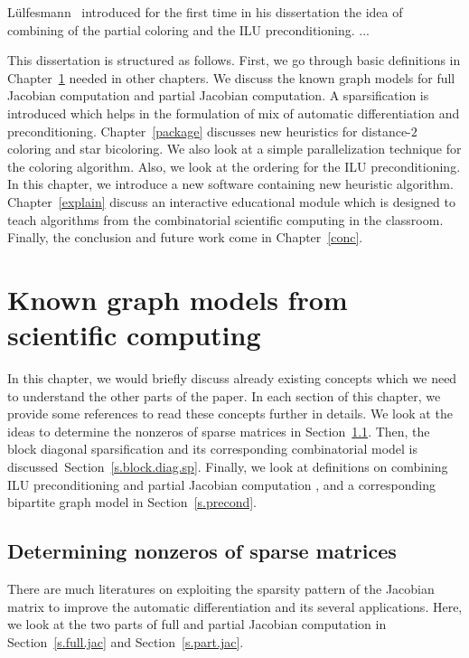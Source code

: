 \documentclass[12pt, twoside,a4paper,toc=bibliography]{scrbook}
\newcommand{\secref}[1]{Section~\protect\ref{#1}}
\newcommand{\chapref}[1]{Chapter~\protect\ref{#1}}
\begin{document}
Lülfesmann~\cite{Lulfesmann2012Fap} introduced for the first time in his dissertation
the idea of combining of the partial coloring and the ILU preconditioning. 
...

This dissertation is structured as follows.
First, we go through basic definitions in \chapref{prel} needed in other chapters.
We discuss the known graph models for full Jacobian computation and partial Jacobian
computation. A sparsification is introduced which helps in the formulation of
mix of automatic differentiation and preconditioning.
\chapref{package} discusses new heuristics for distance-$2$ coloring and
star bicoloring. We also look at a simple parallelization technique for the
coloring algorithm. Also, we look at the ordering for the ILU preconditioning.
In this chapter, we introduce a new software
containing new heuristic algorithm.
\chapref{explain} discuss an interactive educational module
which is designed to teach algorithms from the combinatorial scientific computing in the classroom.
Finally, the conclusion and future work come in \chapref{conc}.

\chapter{Known graph models from scientific computing}
\label{prel}
In this chapter, we would briefly discuss already existing concepts which we need to understand
the other parts of the paper. In each section of this chapter,
we provide some references to read these concepts further in details.
We look at the ideas to determine the nonzeros of sparse matrices in
\secref{s.det.nonzero}. Then, the block diagonal sparsification
and its corresponding combinatorial model is discussed~\secref{s.block.diag.sp}.
Finally, we look at definitions on combining ILU preconditioning and 
partial Jacobian computation
, and a corresponding bipartite graph model in \secref{s.precond}.

\section{Determining nonzeros of sparse matrices}
\label{s.det.nonzero}
There are much literatures on exploiting the sparsity pattern of the Jacobian matrix
to improve the automatic differentiation and its several applications.
Here, we look at the two parts of full and partial Jacobian computation in
\secref{s.full.jac} and \secref{s.part.jac}.
\end{document}
